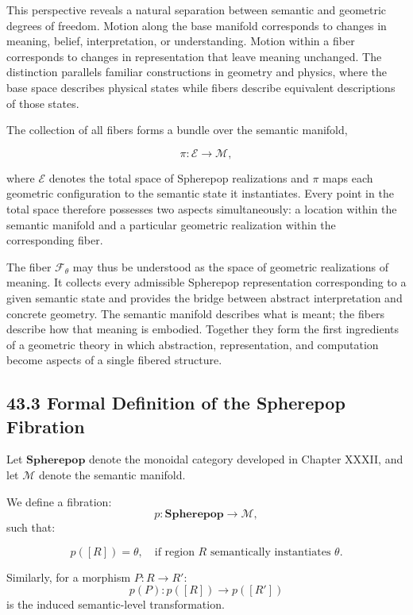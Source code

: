 \documentclass[12pt,letterpaper]{article}
\theoremstyle{remark}
\begin{document}
This perspective reveals a natural separation between semantic and geometric degrees of freedom. Motion along the base manifold corresponds to changes in meaning, belief, interpretation, or understanding. Motion within a fiber corresponds to changes in representation that leave meaning unchanged. The distinction parallels familiar constructions in geometry and physics, where the base space describes physical states while fibers describe equivalent descriptions of those states.

The collection of all fibers forms a bundle over the semantic manifold,

\[
\pi : \mathcal{E} \to \mathcal{M},
\]

where $\mathcal{E}$ denotes the total space of Spherepop realizations and $\pi$ maps each geometric configuration to the semantic state it instantiates. Every point in the total space therefore possesses two aspects simultaneously: a location within the semantic manifold and a particular geometric realization within the corresponding fiber.

The fiber $\mathcal{F}_{\theta}$ may thus be understood as the space of geometric realizations of meaning. It collects every admissible Spherepop representation corresponding to a given semantic state and provides the bridge between abstract interpretation and concrete geometry. The semantic manifold describes what is meant; the fibers describe how that meaning is embodied. Together they form the first ingredients of a geometric theory in which abstraction, representation, and computation become aspects of a single fibered structure.

\subsection{43.3 Formal Definition of the Spherepop Fibration}

Let $\mathbf{Spherepop}$ denote the monoidal category developed in Chapter XXXII, and let $\mathcal{M}$ denote the semantic manifold.

We define a fibration:
\[
p : \mathbf{Spherepop} \to \mathcal{M},
\]
such that:

\[
p([R]) = \theta, \quad \text{if region } R \text{ semantically instantiates } \theta.
\]

Similarly, for a morphism $P : R \to R'$:
\[
p(P) : p([R]) \to p([R'])
\]
is the induced semantic-level transformation.
\end{document}
